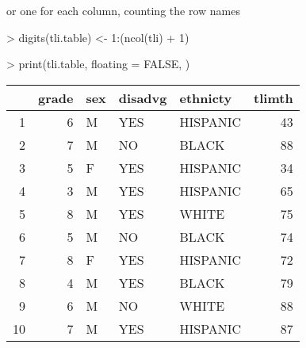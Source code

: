 \documentclass[letterpaper]{article}
\begin{document}
or one for each column, counting the row names
\begin{Schunk}
\begin{Sinput}
> digits(tli.table) <- 1:(ncol(tli) + 1)
\end{Sinput}
\end{Schunk}
\begin{Schunk}
\begin{Sinput}
> print(tli.table, floating = FALSE, )
\end{Sinput}
% latex table generated in R 2.6.0 by xtable 1.5-2 package
% Wed Oct 10 14:26:37 2007
\begin{tabular}{|rr|lp{3cm}l|r|}
  \hline
 & grade & sex & disadvg & ethnicty & tlimth \\
  \hline
1 &   6 & M & YES & HISPANIC &      43 \\
  2 &   7 & M & NO & BLACK &      88 \\
  3 &   5 & F & YES & HISPANIC &      34 \\
  4 &   3 & M & YES & HISPANIC &      65 \\
  5 &   8 & M & YES & WHITE &      75 \\
  6 &   5 & M & NO & BLACK &      74 \\
  7 &   8 & F & YES & HISPANIC &      72 \\
  8 &   4 & M & YES & BLACK &      79 \\
  9 &   6 & M & NO & WHITE &      88 \\
  10 &   7 & M & YES & HISPANIC &      87 \\
   \hline
\end{tabular}\end{Schunk}
\end{document}
